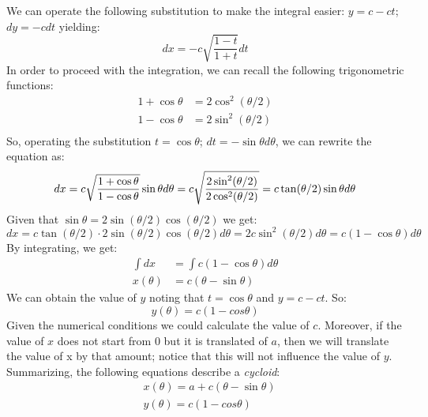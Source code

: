 We can operate the following substitution to make the integral easier: $y = c - ct$; $dy = -cdt$ yielding:
\begin{equation}
    dx = - c \sqrt{\frac{1 - t}{1 + t}} dt
\end{equation}
In order to proceed with the integration, we can recall the following trigonometric functions:
\begin{align}
    1 + \cos\theta &= 2 \cos^2(\theta/2) \\
    1 - \cos \theta &= 2\sin^2(\theta/2) \\
\end{align}
So, operating the substitution $t = \cos \theta$; $dt = -\sin \theta d \theta$, we can rewrite the equation as:
\begin{equation}
    dx = c \sqrt{\frac{1 + \cos \theta}{1 - \cos\theta}} \sin \theta d\theta = c \sqrt{\frac{2\sin^2(\theta/2) }{2 \cos^2(\theta/2)}} = c \tan(\theta /2)  \sin \theta d\theta  \\
\end{equation}
Given that $\sin \theta = 2 \sin (\theta /2) \cos (\theta / 2) $ we get:
\begin{equation}
    dx = c \tan(\theta /2) \cdot 2 \sin (\theta /2) \cos (\theta / 2) d\theta = 2c \sin^2 (\theta / 2) d\theta = c(1 - \cos \theta) d \theta
\end{equation}
By integrating, we get:
\begin{align}
    \int dx &= \int c(1 - \cos \theta) d \theta \\
    x(\theta)  &= c(\theta - \sin \theta)
\end{align}
We can obtain the value of $y$ noting that $t = \cos \theta$ and $y = c - ct$. So:
\begin{equation}
    y(\theta)  = c(1-cos \theta)
\end{equation}
Given the numerical conditions we could calculate the value of $c$. Moreover, if the value of $x$ does not start from 0 but it is translated of $a$, then we will translate the value of x by that amount; notice that this will not influence the value of $y$. Summarizing, the following equations describe a \emph{cycloid}:
\begin{align}
    & x(\theta) = a + c(\theta - \sin \theta) \\
    & y(\theta) = c(1-cos \theta)
\end{align}
\QEDB



